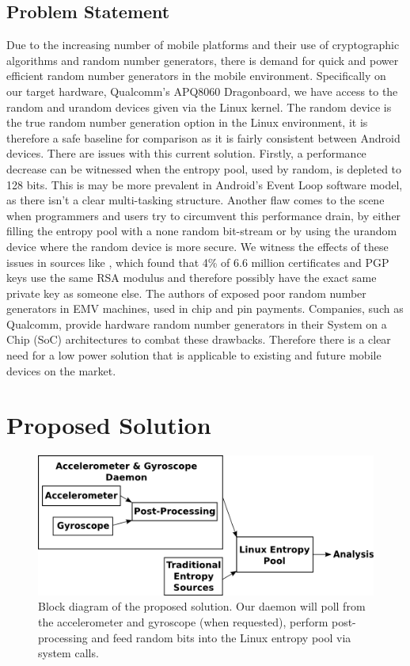 \documentclass[conference]{IEEEtran}
\begin{document}
\subsection{Problem Statement}
Due to the increasing number of mobile platforms and their use of cryptographic algorithms and random number generators, there is demand for quick 
and power efficient random number generators in the mobile environment. Specifically on our target hardware, Qualcomm's APQ8060 Dragonboard, we have 
access to the random and urandom devices given via the Linux kernel. The random device is the true random number generation option in the Linux 
environment, it is therefore a safe baseline for comparison as it is fairly consistent between Android devices. There are issues with this current solution.
Firstly, a performance decrease can be witnessed when the entropy pool, used by random, is depleted to 128 bits. This is may be more prevalent in Android's
Event Loop software model, as there isn't a clear multi-tasking structure. Another flaw comes to the scene when programmers and users try to circumvent
this performance drain, by either filling the entropy pool with a none random bit-stream or by using the urandom device where the random device is more secure.
We witness the effects of these issues in sources like \cite{ron_was_wrong}, which found that 4\% of 6.6 million certificates and PGP keys use the same RSA 
modulus and therefore possibly have the exact same private key as someone else. The authors of \cite{chip_and_skim} exposed poor random number generators
in EMV machines, used in chip and pin payments. Companies, such as Qualcomm, provide hardware random number generators in their System on a Chip (SoC) architectures to combat these drawbacks. 
Therefore there is a clear need for a low power solution that is applicable to existing and future mobile devices on the market.


\section{Proposed Solution}
\begin{figure}[t]
	\includegraphics[width=\columnwidth]{proposed_solution}
	\caption{Block diagram of the proposed solution.  Our daemon will poll from the accelerometer and gyroscope (when requested), perform post-processing and feed random bits into the Linux entropy pool via system calls.}
	\label{proposed_solution_block}
\end{figure}
\end{document}
